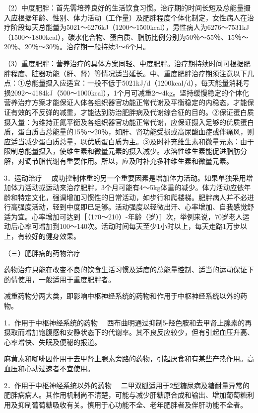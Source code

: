 （2）中度肥胖：首先需培养良好的生活饮食习惯。治疗期的时间长短及总能量摄入应根据年龄、性别、体力活动（工作量）及肥胖程度个体化制定，女性病人在治疗阶段每天总能量为5021～6276kJ（1200～1500kcal），男性病人为6276～7531kJ（1500～1800kcal），碳水化合物、蛋白质、脂肪比例分别为50％～55％、15％～20％、20％～30％。治疗期一般持续3～6个月。

（3）重度肥胖：营养治疗的具体方案同轻、中度肥胖。治疗期持续时间可根据肥胖程度、脏器功能（肝、肾）等情况适当延长。中、重度肥胖治疗期须注意以下几点：①总能量摄入应适宜：一般不低于5021kJ/d（1200kcal/d），每天能量消耗亏损2092～4184kJ（500～1000kcal），1个月可减重2～4kg。坚持缓慢稳定的个体化营养治疗方案才能保证人体各组织器官功能正常代谢及平衡稳定的内稳态，才能保证有效的不反弹的减重，才能达到防治肥胖病及代谢综合征的目的。②保证蛋白质摄入量：为维持正氮平衡及各组织器官功能正常代谢，应保证摄入足够的优质蛋白质，蛋白质占总能量的15％～20％，如肝、肾功能受损或高尿酸血症或伴痛风，则应适当减少蛋白质总量，以优质蛋白质为主。③及时补充维生素和微量元素：由于限制总能量摄入，使维生素和微量元素的摄入减少。水溶性维生素能促进脂肪分解，对调节脂代谢有重要作用。所以，应及时补充多种维生素和微量元素。

{3．运动治疗}
　成功控制体重的另一个重要因素是增加体力活动。如果单独采用增加体力活动或运动来治疗肥胖，3个月可能有4～5kg体重的减少。体力活动应依年龄和特定文化，强调增加习惯性的日常活动，如步行和爬楼梯。肥胖病人并不必进行高强度活动，轻到中度即已足够。活动强度以轻微出汗、心率增加、自我感觉舒适为宜。心率增加可达到［（170～210）-年龄（岁）］次，举例来说，70岁老人运动后心率可增加到100～140次。活动时间每天至少1小时以上，每天走路1万步以上，有较好的健身效果。

（三）肥胖病的药物治疗

药物治疗只能在改变不良的饮食生活习惯及适度的总能量控制、适当的运动保证下酌情使用，一般适用于重度肥胖者。

减重药物分两大类，即影响中枢神经系统的药物和作用于中枢神经系统以外的药物。

{1．作用于中枢神经系统的药物}
　西布曲明通过抑制5-羟色胺和去甲肾上腺素的再摄取而增加饱腹感和安静状态下的代谢率。其不良反应较少，但有引起血压升高、心率增快、失眠及便秘的报道。

麻黄素和咖啡因作用于去甲肾上腺素旁路的药物，引起厌食和有某些产热作用。高血压和心动过速者不宜使用。

{2．作用于中枢神经系统以外的药物}
　二甲双胍适用于2型糖尿病及糖耐量异常的肥胖病病人。其作用机制尚不清楚，可能与减少肝糖原合成和输出、增加葡萄糖利用及抑制葡萄糖吸收有关。慎用于心功能不全、老年肥胖者及伴肝功能不全者。

